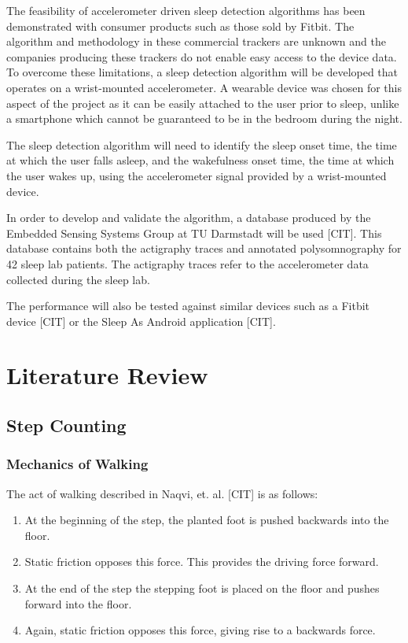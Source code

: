             The feasibility of accelerometer driven sleep detection algorithms has been demonstrated with consumer products such as those sold by Fitbit. The algorithm and methodology in these commercial trackers are unknown and the companies producing these trackers do not enable easy access to the device data. To overcome these limitations, a sleep detection algorithm will be developed that operates on a wrist-mounted accelerometer. A wearable device was chosen for this aspect of the project as it can be easily attached to the user prior to sleep, unlike a smartphone which cannot be guaranteed to be in the bedroom during the night.

            The sleep detection algorithm will need to identify the sleep onset time, the time at which the user falls asleep, and the wakefulness onset time, the time at which the user wakes up, using the accelerometer signal provided by a wrist-mounted device.

            In order to develop and validate the algorithm, a database produced by the Embedded Sensing Systems Group at TU Darmstadt will be used [CIT]. This database contains both the actigraphy traces and annotated polysomnography for 42 sleep lab patients. The actigraphy traces refer to the accelerometer data collected during the sleep lab.

            The performance will also be tested against similar devices such as a Fitbit device [CIT] or the Sleep As Android application [CIT]. 


    \chapter{Literature Review}


        \section{Step Counting}

            \subsection{Mechanics of Walking}

                The act of walking described in Naqvi, et. al. [CIT] is as follows:

                \begin{enumerate}
                    \item At the beginning of the step, the planted foot is pushed backwards into the floor.
                    \item Static friction opposes this force. This provides the driving force forward.
                    \item At the end of the step the stepping foot is placed on the floor and pushes forward into the floor.
                    \item Again, static friction opposes this force, giving rise to a backwards force.
                \end{enumerate}

